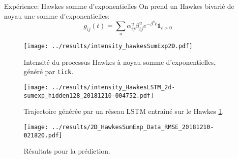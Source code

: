 \documentclass{beamer}
\begin{document}
\appendix

\begin{frame}{Expérience: Hawkes somme d'exponentielles}
On prend un Hawkes bivarié de noyau une somme d'exponentielles:
\[
	g_{ij}(t) = \sum_u \alpha_{ij}^u\beta_{ij}^u e^{-\beta^ut}\mathds{1}_{t > 0}
\]
\end{frame}

\begin{frame}
\begin{figure}
	\texttt{[image: ../results/intensity\_hawkesSumExp2D.pdf]}
	\caption{Intensité du processus Hawkes à noyau somme d'exponentielles, généré par \texttt{tick}.}\label{fig:hawkesSumExpIntensityPlot}
\end{figure}
\end{frame}

\begin{frame}
\begin{figure}
	\texttt{[image: ../results/intensity\_HawkesLSTM\_2d-sumexp\_hidden128\_20181210-004752.pdf]}
	\caption{Trajectoire générée par un réseau LSTM entraîné sur le Hawkes \cref{fig:hawkesSumExpIntensityPlot}.}
\end{figure}
\end{frame}

\begin{frame}
\begin{figure}
	\texttt{[image: ../results/2D\_HawkesSumExp\_Data\_RMSE\_20181210-021820.pdf]}\caption{Résultats pour la prédiction.}
\end{figure}
\end{frame}
\end{document}
